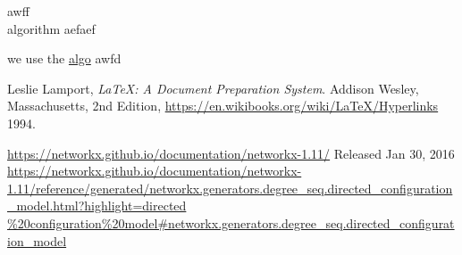 \documentclass{article}
\begin{document}
awff \\
\hypertarget{label1}{algorithm} aefaef \\


\newpage

we use the \hyperlink{label1}{algo} awfd\\


\begin{thebibliography}{999}

  Leslie Lamport,
  \emph{\LaTeX: A Document Preparation System}.
  Addison Wesley, Massachusetts,
  2nd Edition,
  \url{https://en.wikibooks.org/wiki/LaTeX/Hyperlinks}
  1994.
 

  \url{https://networkx.github.io/documentation/networkx-1.11/} 
  Released Jan 30, 2016
  \url{https://networkx.github.io/documentation/networkx-1.11/reference/generated/networkx.generators.degree_seq.directed_configuration_model.html?highlight=directed
  
\end{thebibliography}
\end{document}

